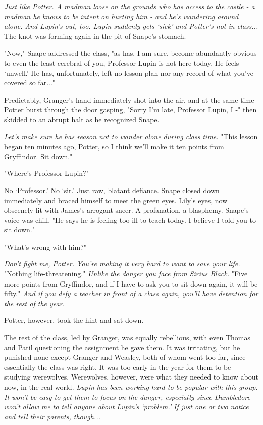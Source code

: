 \emph{Just like Potter. A madman loose on the grounds who has access to the castle - a madman he knows to be intent on hurting him - and he's wandering around alone. And Lupin's out, too. Lupin suddenly gets `sick' and Potter's not in class...} The knot was forming again in the pit of Snape's stomach.

"Now," Snape addressed the class, "as has, I am sure, become abundantly obvious to even the least cerebral of you, Professor Lupin is not here today. He feels `unwell.' He has, unfortunately, left no lesson plan nor any record of what you've covered so far..."

Predictably, Granger's hand immediately shot into the air, and at the same time Potter burst through the door gasping, "Sorry I'm late, Professor Lupin, I -" then skidded to an abrupt halt as he recognized Snape.

\emph{Let's make sure he has reason not to wander alone during class time.} "This lesson began ten minutes ago, Potter, so I think we'll make it ten points from Gryffindor. Sit down."

"Where's Professor Lupin?"

No `Professor.' No `sir.' Just raw, blatant defiance. Snape closed down immediately and braced himself to meet the green eyes. Lily's eyes, now obscenely lit with James's arrogant sneer. A profanation, a blasphemy. Snape's voice was chill, "He says he is feeling too ill to teach today. I believe I told you to sit down."

"What's wrong with him?"

\emph{Don't fight me, Potter. You're making it very hard to want to save your life.} "Nothing life-threatening." \emph{Unlike the danger you face from Sirius Black.} "Five more points from Gryffindor, and if I have to ask you to sit down again, it will be fifty." \emph{And if you defy a teacher in front of a class again, you'll have detention for the rest of the year.}

Potter, however, took the hint and sat down.

The rest of the class, led by Granger, was equally rebellious, with even Thomas and Patil questioning the assignment he gave them. It was irritating, but he punished none except Granger and Weasley, both of whom went too far, since essentially the class was right. It was too early in the year for them to be studying werewolves. Werewolves, however, were what they needed to know about now, in the real world. \emph{Lupin has been working hard to be popular with this group. It won't be easy to get them to focus on the danger, especially since Dumbledore won't allow me to tell anyone about Lupin's `problem.' If just one or two notice and tell their parents, though...}

